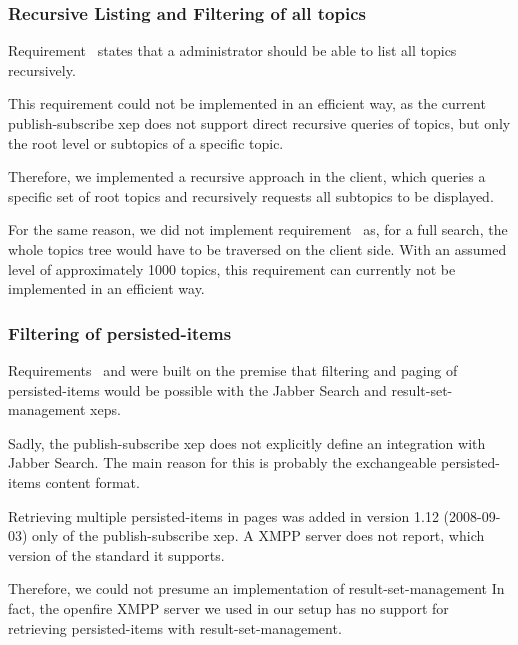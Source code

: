 \subsubsection{Recursive Listing and Filtering of all \glspl{topic}}

Requirement~ states that a administrator should be able to list all topics recursively.

This requirement could not be implemented in an efficient way, as the current \gls{publish-subscribe} \gls{xep} does not support direct recursive queries of \glspl{topic}, but only the root level or subtopics of a specific topic.

Therefore, we implemented a recursive approach in the client, which queries a specific set of root \glspl{topic} and recursively requests all subtopics to be displayed.

For the same reason, we did not implement requirement~ as, for a full search, the whole \glspl{topic} tree would have to be traversed on the client side.
With an assumed level of approximately 1000 \glspl{topic}, this requirement can currently not be implemented in an efficient way.

\subsubsection{Filtering of \glspl{persisted-item}}

Requirements~ and  were built on the premise that filtering and paging of \glspl{persisted-item} would be possible with the Jabber Search \cite{xep-0055} and \gls{result-set-management} \cite{xep-0059} \glspl{xep}.

Sadly, the \gls{publish-subscribe} \gls{xep} does not explicitly define an integration with Jabber Search.
The main reason for this is probably the exchangeable \glspl{persisted-item} content format.

Retrieving multiple \glspl{persisted-item} in pages was added in version 1.12 (2008-09-03) only of the \gls{publish-subscribe} \gls{xep}.
A XMPP server does not report, which version of the standard it supports.

Therefore, we could not presume an implementation of \gls{result-set-management}
In fact, the openfire XMPP server we used in our setup has no support for retrieving \glspl{persisted-item} with \gls{result-set-management}.


